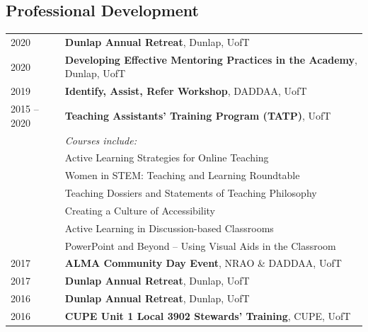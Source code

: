 \documentclass[10pt]{res} %
\begin{document}
\begin{resume}

\section{\Large Professional Development}
\vspace{-5pt} %
\noindent\makebox[\linewidth]{\rule{\textwidth}{0.4pt}}
\vspace{-20pt} %

\begin{table}[h!]
\begin{tabularx}{\textwidth}{lX}
2020 & \textbf{Dunlap Annual Retreat}, Dunlap, UofT \\
2020 & \textbf{Developing Effective Mentoring Practices in the Academy}, Dunlap, UofT \\
2019 & \textbf{Identify, Assist, Refer Workshop}, DADDAA, UofT \\
2015 -- 2020  & \textbf{Teaching Assistants' Training Program (TATP)}, UofT \\
				& \textit{Courses include:} \\
			        & Active Learning Strategies for Online Teaching \\
                                  & Women in STEM: Teaching and Learning Roundtable \\
                                  & Teaching Dossiers and Statements of Teaching Philosophy \\
                                  & Creating a Culture of Accessibility \\
                                  & Active Learning in Discussion-based Classrooms \\
                                  & PowerPoint and Beyond -- Using Visual Aids in the Classroom \\
2017 & \textbf{ALMA Community Day Event}, NRAO \& DADDAA, UofT \\
2017 & \textbf{Dunlap Annual Retreat}, Dunlap, UofT \\
2016 & \textbf{Dunlap Annual Retreat}, Dunlap, UofT \\
2016 & \textbf{CUPE Unit 1 Local 3902 Stewards' Training}, CUPE, UofT
\end{tabularx}
\end{table}


\end{resume}
\end{document}
